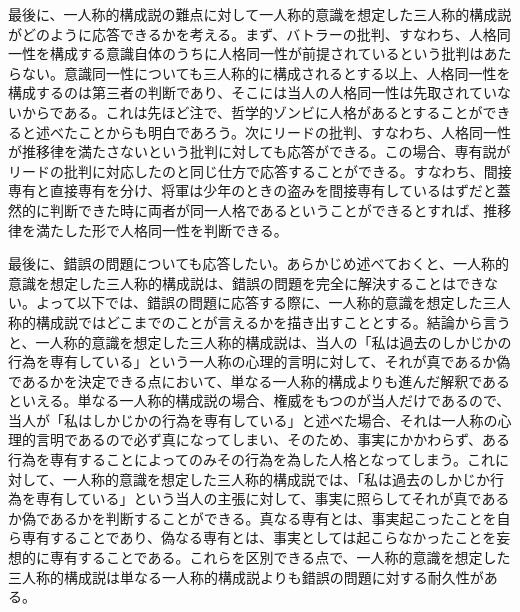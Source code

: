\documentclass[a4j,oneside]{jsbook}
\begin{document}
最後に、一人称的構成説の難点に対して一人称的意識を想定した三人称的構成説がどのように応答できるかを考える。まず、バトラーの批判、すなわち、人格同一性を構成する意識自体のうちに人格同一性が前提されているという批判はあたらない。意識同一性についても三人称的に構成されるとする以上、人格同一性を構成するのは第三者の判断であり、そこには当人の人格同一性は先取されていないからである。これは先ほど注で、哲学的ゾンビに人格があるとすることができると述べたことからも明白であろう。次にリードの批判、すなわち、人格同一性が推移律を満たさないという批判に対しても応答ができる。この場合、専有説がリードの批判に対応したのと同じ仕方で応答することができる。すなわち、間接専有と直接専有を分け、将軍は少年のときの盗みを間接専有しているはずだと蓋然的に判断できた時に両者が同一人格であるということができるとすれば、推移律を満たした形で人格同一性を判断できる。
\par
最後に、錯誤の問題についても応答したい。あらかじめ述べておくと、一人称的意識を想定した三人称的構成説は、錯誤の問題を完全に解決することはできない。よって以下では、錯誤の問題に応答する際に、一人称的意識を想定した三人称的構成説ではどこまでのことが言えるかを描き出すこととする。結論から言うと、一人称的意識を想定した三人称的構成説は、当人の「私は過去のしかじかの行為を専有している」という一人称の心理的言明に対して、それが真であるか偽であるかを決定できる点において、単なる一人称的構成よりも進んだ解釈であるといえる。単なる一人称的構成説の場合、権威をもつのが当人だけであるので、当人が「私はしかじかの行為を専有している」と述べた場合、それは一人称の心理的言明であるので必ず真になってしまい、そのため、事実にかかわらず、ある行為を専有することによってのみその行為を為した人格となってしまう。これに対して、一人称的意識を想定した三人称的構成説では、「私は過去のしかじか行為を専有している」という当人の主張に対して、事実に照らしてそれが真であるか偽であるかを判断することができる。真なる専有とは、事実起こったことを自ら専有することであり、偽なる専有とは、事実としては起こらなかったことを妄想的に専有することである。これらを区別できる点で、一人称的意識を想定した三人称的構成説は単なる一人称的構成説よりも錯誤の問題に対する耐久性がある。
\par
\end{document}
